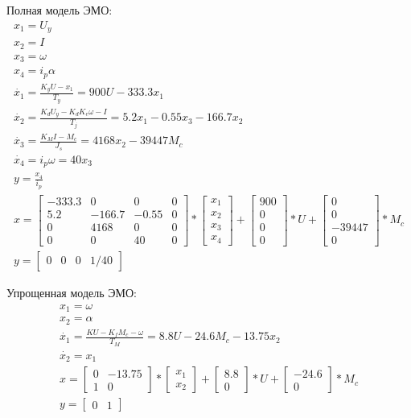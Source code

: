 \documentclass[a4paper, 12pt]{article}
\begin{document}
Полная модель ЭМО:
\begin{gather}
x_1=U_y\\
x_2=I\\
x_3=\omega\\
x_4=i_p\alpha\\
\dot{x_1}=\frac{K_yU-x_1}{T_y}=900U-333.3x_1\\
\dot{x_2}=\frac{K_dU_y-K_dK_e\omega-I}{T_j}=5.2x_1-0.55x_3-166.7x_2\\
\dot{x_3}=\frac{K_MI-M_c}{J_s}=4168x_2-39447M_c\\
\dot{x_4}=i_p\omega=40x_3\\
y=\frac{x_4}{i_p}\\
x=\begin{bmatrix} -333.3 & 0 & 0 & 0 \\ 5.2 & -166.7 & -0.55 & 0 \\ 0 & 4168 & 0 & 0 \\ 0 & 0 & 40 & 0 \end{bmatrix}*\begin{bmatrix}x_1\\x_2\\x_3\\x_4\end{bmatrix}+\begin{bmatrix}900\\0\\0\\0\end{bmatrix}*U+\begin{bmatrix}0\\0\\-39447\\0\end{bmatrix}*M_c\\
y=\begin{bmatrix}0 & 0 & 0 & 1/40 \end{bmatrix}
\end{gather}\par
\vspace{0.5cm}
Упрощенная модель ЭМО:
\begin{gather}
x_1=\omega\\
x_2=\alpha\\
\dot{x_1}=\frac{KU-K_fM_c-\omega}{T_M}=8.8U-24.6M_c-13.75x_2\\
\dot{x_2}=x_1\\
x=\begin{bmatrix} 0 & -13.75  \\ 1 &    0\end{bmatrix}*\begin{bmatrix}x_1\\x_2\end{bmatrix}+\begin{bmatrix}8.8\\0\end{bmatrix}*U+\begin{bmatrix}-24.6\\0\end{bmatrix}*M_c\\
y=\begin{bmatrix} 0 & 1 \end{bmatrix}
\end{gather}
\end{document}
